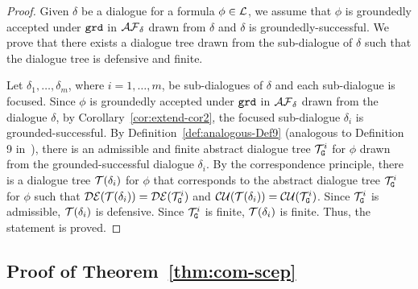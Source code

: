 \begin{proof}
Given $\delta$ be a dialogue for a formula $\phi \in \mathcal{L}$, we assume that $\phi$ is groundedly accepted under $\texttt{\textup{grd}}$ in $\mathcal{AF}_{\delta}$ drawn from $\delta$ and $\delta$ is groundedly-successful. We prove that there exists a dialogue tree drawn from the sub-dialogue of $\delta$ such that the dialogue tree is defensive and finite.

Let $\delta_1, \ldots, \delta_m$, where $i = 1, \ldots, m$, be sub-dialogues of $\delta$ and each sub-dialogue is focused.
Since $\phi$ is groundedly accepted under $\texttt{\textup{grd}}$ in $\mathcal{AF}_{\delta}$ drawn from the dialogue $\delta$, by Corollary~\ref{cor:extend-cor2}, the focused sub-dialogue $\delta_{i}$ is grounded-successful.
By Definition~\ref{def:analogous-Def9} (analogous to Definition 9 in~\cite{loanho_2024}), there is an admissible and finite abstract dialogue tree $\mathcal{T}^{i}_{\texttt{\textup{G}}}$ for $\phi$ drawn from the grounded-successful dialogue $\delta_i$.
%
By the correspondence principle, there is a dialogue tree $\mathcal{T}(\delta_i)$ for $\phi$ that corresponds to the abstract dialogue tree $\mathcal{T}_{\texttt{\textup{G}}}^{i}$ for $\phi$ such that  $\mathcal{DE}(\mathcal{T}(\delta_i)) = \mathcal{DE}(\mathcal{T}_{\texttt{\textup{G}}}^{i})$ and $\mathcal{CU}(\mathcal{T}(\delta_ i)) = \mathcal{CU}(\mathcal{T}_{\texttt{\textup{G}}}^{i})$.
Since $\mathcal{T}_{\texttt{\textup{G}}}^{i}$ is admissible, $\mathcal{T}(\delta_i)$ is defensive. Since $\mathcal{T}_{\texttt{\textup{G}}}^{i}$ is finite, $\mathcal{T}(\delta_i)$ is finite.  Thus, the statement is proved.
\end{proof}

\subsection{Proof of Theorem~\ref{thm:com-scep}}

\compsceptical*


